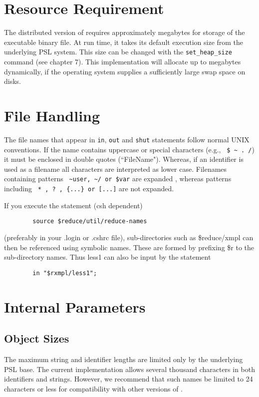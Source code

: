\section{Resource Requirement}
The distributed version of {\REDUCE} requires approximately
{\executablespace} megabytes for storage of the executable binary file.
At run time, it takes its default execution size from the
underlying PSL system.
This size can be changed with the \verb|set_heap_size| command 
(see chapter 7). 
This implementation will allocate up to {\virtualsize} megabytes
dynamically, if the operating system supplies a sufficiently large swap
space on disks.

\section{File Handling}
The file names that appear in {\tt in}, {\tt out} and {\tt shut}
statements follow normal UNIX conventions.  If the name contains uppercase
or special characters (e.g., \verb| $ ~ . /|)
it must be enclosed in double quotes
(``FileName").  Whereas, if an
identifier is used as a filename all characters are
interpreted as lower case.
Filenames containing patterns \verb| ~user, ~/ or $var| are expanded , whereas
patterns including \verb| * , ? , {...} or [...]| are not expanded.


If you execute the statement (csh dependent)
\begin{verbatim}
        source $reduce/util/reduce-names
\end{verbatim}
(preferably in your .login or .cshrc file), {\REDUCE} sub-directories such
as \$reduce/xmpl can then be referenced using symbolic names.  These are
formed by prefixing \$r to the sub-directory names.  Thus less1 can also
be input by the statement
\begin{verbatim}
        in "$rxmpl/less1";
\end{verbatim}

\section{Internal Parameters}

\subsection{Object Sizes}
The maximum string and identifier lengths are limited only by the
underlying PSL base.  The current implementation allows several thousand
characters in both identifiers and strings.  However, we recommend that
such names be limited to 24 characters or less for compatibility with
other versions of {\REDUCE}.

